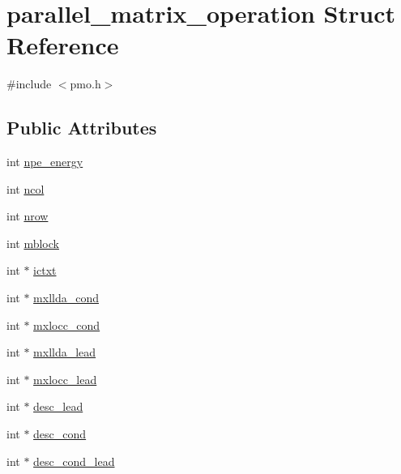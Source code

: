 \hypertarget{structparallel__matrix__operation}{\section{parallel\-\_\-matrix\-\_\-operation Struct Reference}
\label{structparallel__matrix__operation}
}


{\ttfamily \#include $<$pmo.\-h$>$}

\subsection*{Public Attributes}
\begin{DoxyCompactItemize}
\item 
int \hyperlink{structparallel__matrix__operation_a108e72e07094a6e913262f9b23d4022d}{npe\-\_\-energy}
\item 
int \hyperlink{structparallel__matrix__operation_ac4c45a50a5772a4b11fcfa3c7f60e781}{ncol}
\item 
int \hyperlink{structparallel__matrix__operation_a6482da1ae3f20a921362805e532f7e34}{nrow}
\item 
int \hyperlink{structparallel__matrix__operation_a0773c16360473e45827c3f23d0f10ddd}{mblock}
\item 
int $\ast$ \hyperlink{structparallel__matrix__operation_a8a144d6989aac97c238ee2d3d2103c62}{ictxt}
\item 
int $\ast$ \hyperlink{structparallel__matrix__operation_ad063b0318dee37d06f607f1232b8b69a}{mxllda\-\_\-cond}
\item 
int $\ast$ \hyperlink{structparallel__matrix__operation_a89f2f9c913525dbbbb6c5a81739ff357}{mxlocc\-\_\-cond}
\item 
int $\ast$ \hyperlink{structparallel__matrix__operation_aac90c16db1a6213a4348f131a1c1ca21}{mxllda\-\_\-lead}
\item 
int $\ast$ \hyperlink{structparallel__matrix__operation_a0a29292d2306e9a9ad30edaaffa600f8}{mxlocc\-\_\-lead}
\item 
int $\ast$ \hyperlink{structparallel__matrix__operation_a44eb7f984f2feb6d103982435c05488e}{desc\-\_\-lead}
\item 
int $\ast$ \hyperlink{structparallel__matrix__operation_a3863e4fc074a4b974e7fdbb363bf783a}{desc\-\_\-cond}
\item 
int $\ast$ \hyperlink{structparallel__matrix__operation_a128bd398cde34666dc68235115edd6a3}{desc\-\_\-cond\-\_\-lead}
\item 

\end{DoxyCompactItemize}
